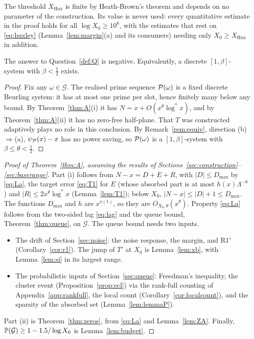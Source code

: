 The threshold $X_{\mathrm{Hux}}$ is finite by Heath-Brown's theorem \cite{HeathBrown1988} and depends on no parameter of the
construction. Its value is never used: every quantitative estimate in the proof holds for all $\log X_0\ge10^8$, with the
estimates that rest on \eqref{eq:huxley} (Lemma~\ref{lem:margin}(a) and its consumers) needing only $X_0\ge X_{\mathrm{Hux}}$ in
addition.

\begin{corollary}\label{cor:notQ}
The answer to Question~\ref{def:Q} is negative. Equivalently, a discrete $[1,\beta]$-system with $\beta<\tfrac12$ exists.
\end{corollary}

\begin{proof}
Fix any $\omega\in\mathcal G$. The realised prime sequence $\mathcal{P}(\omega)$ is a fixed discrete Beurling system: it has at most one
prime per slot, hence finitely many below any bound. By Theorem~\ref{thm:A}(i) it has $N=x+O(x^{\theta}\log^*x)$, and by Theorem~\ref{thm:A}(ii) it has no zero-free half-plane. That $T$ was constructed adaptively
plays no role in this conclusion. By Remark~\ref{rem:equiv}, direction (b)$\Rightarrow$(a), $\psi_{\mathcal{P}}(x)-x$ has
no power saving, so $\mathcal{P}(\omega)$ is a $[1,\beta]$-system with $\beta\le\theta<\tfrac12$.
\end{proof}

\begin{proof}[Proof of Theorem~\ref{thm:A}, assuming the results of Sections~\ref{sec:construction}--\ref{sec:baserange}]
Part (i) follows from $N-x=D+E+R$, with $|D|\le D_{\max}$ by \eqref{eq:La}, the target error \eqref{eq:T1} for $E$ (whose
absorbed part is at most $h(x)\Lambda^{-8}$) and $|R|\le2x^{\theta}\log^*x$ (Lemma~\ref{lem:T1}); below $X_0$, $|N-x|\le|D|+1\le D_{\max}$.
The functions $D_{\max}$ and $h$ are $x^{o(1)}$, so they are $O_{X_0,\theta}(x^{\theta})$. Property
\eqref{eq:La} follows from the two-sided lag \eqref{eq:lag} and the queue bound, Theorem~\ref{thm:queue}, on $\mathcal G$. The queue
bound needs two inputs.
\begin{itemize}
\item The drift of Section~\ref{sec:noise}: the noise response, the margin, and R1$'$ (Corollary~\ref{cor:r1}). The jump of $T'$
at $X_0$ is Lemma~\ref{lem:xb}, with Lemma~\ref{lem:si} in its largest range.
\item The probabilistic inputs of Section~\ref{sec:queue}: Freedman's inequality, the cluster event (Proposition~\ref{prop:ecl}) via
the rank-full counting of Appendix~\ref{app:rankfull}, the local count (Corollary~\ref{cor:localcount}), and the sparsity of the
absorbed set (Lemma~\ref{lem:lemmaP}).
\end{itemize}
Part (ii) is Theorem~\ref{thm:zeros}, from \eqref{eq:La} and Lemma~\ref{lem:ZA}. Finally, $\mathbb{P}(\mathcal G)\ge1-1.5/\log X_0$ is
Lemma~\ref{lem:budget}.
\end{proof}

